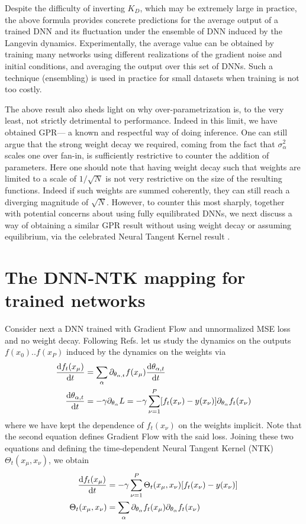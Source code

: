 Despite the difficulty of inverting $K_D$, which may be extremely large in practice, the above formula provides concrete predictions for the average output of a trained DNN and its fluctuation under the ensemble of DNN induced by the Langevin dynamics. Experimentally, the average value can be obtained by training many networks using different realizations of the gradient noise and initial conditions, and averaging the output over this set of DNNs. Such a technique (ensembling) is used in practice for small datasets when training is not too costly. 

The above result also sheds light on why over-parametrization is, to the very least, not strictly detrimental to performance. Indeed in this limit, we have obtained GPR--- a known and respectful way of doing inference. One can still argue that the strong weight decay we required, coming from the fact that  $\sigma^2_{\alpha}$ scales one over fan-in, is sufficiently restrictive to counter the addition of parameters. Here one should note that having weight decay such that weights are limited to a scale of $1/\sqrt{N}$ is not very restrictive on the size of the resulting functions. Indeed if such weights are summed coherently, they can still reach a diverging magnitude of $\sqrt{N}$. However, to counter this most sharply, together with potential concerns about using fully equilibrated DNNs, we next discuss a way of obtaining a similar GPR result without using weight decay or assuming equilibrium, via the celebrated Neural Tangent Kernel result \citep{jacot2018neural}. 

\section{The DNN-NTK mapping for trained networks}
Consider next a DNN trained with Gradient Flow and unnormalized MSE loss and no weight decay. Following Refs. \cite{Jacot2018,lee2019wide} let us study the dynamics on the outputs $f(x_0)..f(x_P)$ induced by the dynamics on the weights via 
\begin{align}
\frac{\text{d} f_t(x_{\mu})}{\text{d} t} &= \sum_{\alpha} \partial_{\theta_{\alpha,t}}f(x_{\mu}) \frac{\text{d} \theta_{\alpha,t}}{\text{d} t} \\ \nonumber 
\frac{\text{d} \theta_{\alpha,t}}{\text{d} t} &= - \gamma \partial_{\theta_{\alpha}} L = -  \gamma  \sum_{\nu=1}^P [f_t(x_{\nu})-y(x_{\nu})] \partial_{\theta_{\alpha}} f_t(x_{\nu})
\end{align}
where we have kept the dependence of $f_t(x_{\nu})$ on the weights implicit. Note that the second equation defines Gradient Flow with the said loss. Joining these two equations and defining the time-dependent Neural Tangent Kernel (NTK) $\Theta_t(x_\mu, x_\nu)$, we obtain 
\begin{align}\label{Eq:NTK}
\frac{\text{d} f_t(x_{\mu})}{\text{d} t} &= -  \gamma \sum_{\nu=1}^P \Theta_t(x_{\mu},x_{\nu}) [f_t(x_{\nu})-y(x_{\nu})]  \\ \nonumber 
\Theta_t(x_{\mu},x_{\nu}) &= \sum_{\alpha} \partial_{\theta_{\alpha}}f_t(x_{\mu}) \partial_{\theta_{\alpha}}f_t(x_{\nu})
\end{align}

